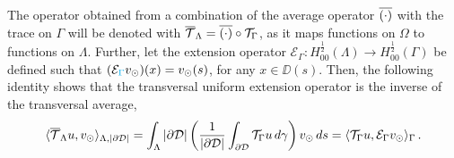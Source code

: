 \documentclass[r]{siamart171218}
\newcommand{\miro}[1]{{\color{cyan}#1}}
\begin{document}
The operator obtained from a combination of the average operator $\overline{(\cdot)}$ with the trace on $\Gamma$ will be denoted with ${\overline{\mathcal{T}}_\Lambda} = \overline{(\cdot)} \circ {\mathcal{T}_\Gamma}$, as it maps functions on $\Omega$ to functions on $\Lambda$.
Further, let the extension operator $\mathcal{E}_{\Gamma}: H^{\frac 1 2}_{00}(\Lambda) \rightarrow H^{\frac 1 2}_{00}(\Gamma)$ be defined such that $(\mathcal{E}_{\miro{\Gamma}}\vd)(x)=\vd(s)$, for any $x\in \DD(s)$. Then, the following identity shows that the transversal uniform extension operator is the inverse of the transversal average,
\begin{equation}\label{eq:ext}
\langle \mtrace u, \vd \rangle_{\Lambda, |\DD|} 
= \int _{\Lambda} |\DD| \left( \frac{1}{|\DD|} \int_{\DD} \trace u \, d\gamma \right) \vd \, ds 
= \langle \trace u, \ext \vd\rangle_{\Gamma}\,.
\end{equation}


\end{document}
